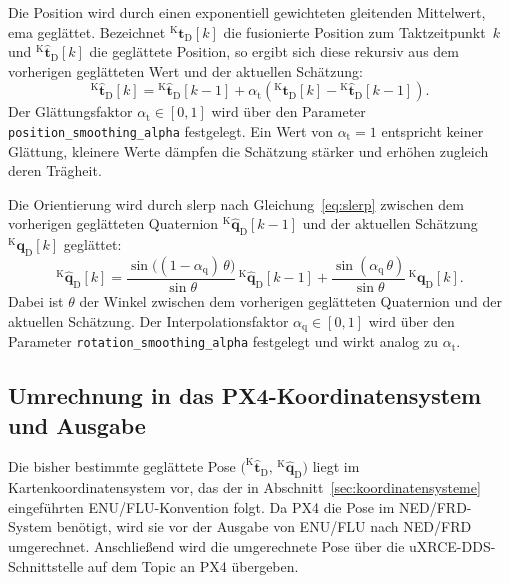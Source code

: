 Die Position wird durch einen exponentiell gewichteten gleitenden Mittelwert, \gls{ema} geglättet.
Bezeichnet $^{\mathrm{K}}\mathbf{t}_{\mathrm{D}}[k]$ die fusionierte Position zum Taktzeitpunkt~$k$ und $^{\mathrm{K}}\hat{\mathbf{t}}_{\mathrm{D}}[k]$ die geglättete Position, so ergibt sich diese rekursiv aus dem vorherigen geglätteten Wert und der aktuellen Schätzung:
\begin{equation}
^{\mathrm{K}}\hat{\mathbf{t}}_{\mathrm{D}}[k] = {^{\mathrm{K}}\hat{\mathbf{t}}_{\mathrm{D}}[k-1]} + \alpha_{\mathrm{t}}\left({^{\mathrm{K}}\mathbf{t}_{\mathrm{D}}[k]} - {^{\mathrm{K}}\hat{\mathbf{t}}_{\mathrm{D}}[k-1]}\right).
\label{eq:pos_ema}
\end{equation}
Der Glättungsfaktor $\alpha_{\mathrm{t}} \in [0,1]$ wird über den Parameter \texttt{position\_smoothing\_alpha} festgelegt.
Ein Wert von $\alpha_{\mathrm{t}} = 1$ entspricht keiner Glättung, kleinere Werte dämpfen die Schätzung stärker und erhöhen zugleich deren Trägheit.

Die Orientierung wird durch \gls{slerp} nach Gleichung~\eqref{eq:slerp} zwischen dem vorherigen geglätteten Quaternion $^{\mathrm{K}}\hat{\mathbf{q}}_{\mathrm{D}}[k-1]$ 
und der aktuellen Schätzung $^{\mathrm{K}}\mathbf{q}_{\mathrm{D}}[k]$ geglättet:
\begin{equation}
^{\mathrm{K}}\hat{\mathbf{q}}_{\mathrm{D}}[k] = \frac{\sin\!\bigl((1-\alpha_{\mathrm{q}})\,\theta\bigr)}{\sin\theta}\,{^{\mathrm{K}}\hat{\mathbf{q}}_{\mathrm{D}}[k-1]} + \frac{\sin(\alpha_{\mathrm{q}}\,\theta)}{\sin\theta}\,{^{\mathrm{K}}\mathbf{q}_{\mathrm{D}}[k]}.
\label{eq:pos_slerp}
\end{equation}
Dabei ist $\theta$ der Winkel zwischen dem vorherigen geglätteten Quaternion und der aktuellen Schätzung.
Der Interpolationsfaktor $\alpha_{\mathrm{q}} \in [0,1]$ wird über den Parameter \texttt{rotation\_smoothing\_alpha} 
festgelegt und wirkt analog zu $\alpha_{\mathrm{t}}$.


\subsection{Umrechnung in das PX4-Koordinatensystem und Ausgabe}
\label{subsec:pos_frame_ausgabe}
Die bisher bestimmte geglättete Pose $\bigl(^{\mathrm{K}}\hat{\mathbf{t}}_{\mathrm{D}},\,{^{\mathrm{K}}\hat{\mathbf{q}}_{\mathrm{D}}}\bigr)$ 
liegt im Kartenkoordinatensystem vor, das der in Abschnitt~\ref{sec:koordinatensysteme} eingeführten ENU/FLU-Konvention folgt.
Da PX4 die Pose im NED/FRD-System benötigt, wird sie vor der Ausgabe von ENU/FLU nach NED/FRD umgerechnet.
Anschließend wird die umgerechnete Pose über die uXRCE-DDS-Schnittstelle auf dem Topic  an PX4 übergeben.

